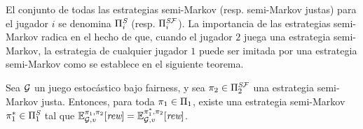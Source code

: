 El conjunto de todas las estrategias semi-Markov (resp. semi-Markov justas) para el jugador $i$ se denomina $\Pi^{\textit{S}}_{i}$ (resp. $\Pi^{\textit{S}\mathcal{F}}_{i}$). La importancia de las estrategias semi-Markov radica en el hecho de que, cuando el jugador $2$ juega una estrategia semi-Markov, la estrategia de cualquier jugador $1$ puede ser imitada por una estrategia semi-Markov como se establece en el siguiente teorema.

\begin{lemma}\label{lm:semmimarkov2}
  Sea $\mathcal{G}$ un juego estocástico bajo fairness,  y sea
  $\pi_{2} \in \Pi^{\textit{S}\mathcal{F}}_{2}$ una estrategia semi-Markov
  justa. Entonces, para toda $\pi_{1} \in \Pi_{1}$, existe una estrategia
  semi-Markov $\pi^*_{1} \in \Pi^{\textit{S}}_{1}$
  tal que
  $\mathbb{E}^{\pi_{1}, \pi_{2}}_{\mathcal{G}, v}[\textit{rew}] =
  \mathbb{E}^{\pi^*_{1}, \pi_{2}}_{\mathcal{G}, v}[\textit{rew}]$.
\end{lemma}
%
\iffalse
